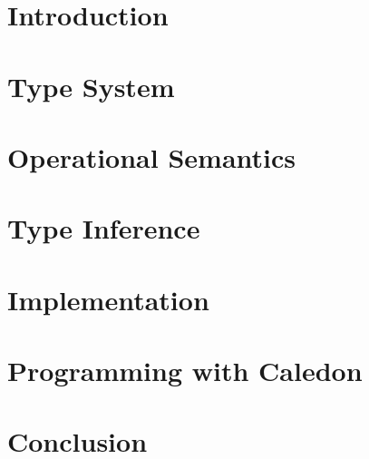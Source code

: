 \documentclass[12pt]{cmuthesis}
\begin{document}
\newtheorem{tcase}{Case}
      
\chapter{Introduction}
    
    
     
\chapter{Type System}
    
     
    
    
  
\chapter{Operational Semantics}
    
    
    
    
    
    
          
\chapter{Type Inference} 
    
     
    
    
             
\chapter{Implementation}
    
    
     
    
    
 
\chapter{Programming with Caledon}
    
    
  
\chapter{Conclusion}
   
   
    
\appendix
 
\end{document}
